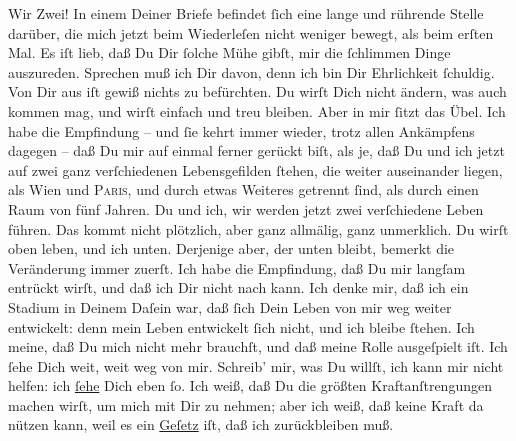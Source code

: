 \pstart
           Wir Zwei! In einem Deiner Briefe befindet{ }ſich eine lange und rührende Stelle
               darüber, die mich jetzt beim Wiederleſen nicht weniger bewegt, als beim 
               erſten Mal. Es iſt lieb, daß Du Dir{ }ſolche Mühe gibſt, mir die{ }ſchlimmen Dinge
               auszureden. Sprechen muß ich Dir davon, denn ich bin Dir Ehrlichkeit{ }ſchuldig. Von
               Dir aus iſt gewiß nichts zu befürchten. Du wirſt {\pb}Dich nicht ändern, was auch kommen mag, und wirſt einfach und treu bleiben. Aber in
               mir{ }ſitzt das Übel. Ich habe die Empfindung – und{ }ſie kehrt immer wieder, trotz allen
               Ankämpfens dagegen – daß Du mir auf einmal ferner gerückt biſt, als je, daß Du und
               ich jetzt auf zwei ganz verſchiedenen Lebensgefilden{ }ſtehen, die weiter auseinander
               liegen, als \strikeout{\textcolor{gray}{fe}}{ }Wien und \textsc{Paris}, und  durch etwas Weiteres getrennt{ }ſind, als
               durch einen Raum von fünf Jahren. Du und ich,  wir
               werden jetzt zwei {\pb}verſchiedene Leben führen. Das
                  \strikeout{\textcolor{gray}{×}} kommt nicht plötzlich, aber ganz  allmälig,
               ganz unmerklich. Du wirſt oben leben, und ich unten. Derjenige aber, der unten
               bleibt, bemerkt die Veränderung immer zuerſt. Ich \strikeout{\textcolor{gray}{b}} habe die Empfindung, daß Du  mir langſam
               entrückt wirſt, und daß ich Dir nicht nach kann. Ich denke  mir, daß ich ein Stadium in Deinem Daſein war, daß{ }ſich Dein Leben von mir weg weiter entwickelt: denn mein Leben  entwickelt{ }ſich {\pb}nicht, und ich bleibe{ }ſtehen. Ich meine, daß Du mich nicht mehr brauchſt, und daß
               meine Rolle \label{K_L02758-12v}\label{K_L02758-12} ausgeſpielt iſt. Ich{ }ſehe Dich weit, weit weg von mir. Schreib’ mir,
               was Du willſt, ich kann mir nicht helfen: ich \uline{ſehe}
               Dich eben{ }ſo. Ich weiß, daß Du die größten Kraftanſtrengungen machen wirſt, um mich
               mit Dir zu nehmen; aber ich weiß, daß {\pb}keine Kraft
               da nützen kann, weil es ein \uline{Geſetz} iſt, daß ich
               zurückbleiben muß.\pend
           
